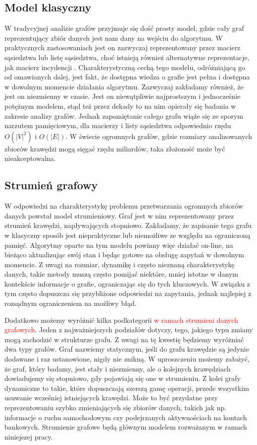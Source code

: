     \subsection{Model klasyczny}
        W tradycyjnej analizie grafów przyjmuje się dość prosty model, gdzie cały graf reprezentujący zbiór danych jest nam dany na wejściu do algorytmu. W praktycznych zastosowaniach jest on zazwyczaj reprezentowany przez macierz sąsiedztwa lub listę sąsiedztwa, choć istnieją również alternatywne reprezentacje, jak macierz incydencji \cite{Wilson_2015}. Charakterystyczną cechą tego modelu, odróżniającą go od omawianych dalej, jest fakt, że dostępna wiedza o grafie jest pełna i dostępna w dowolnym momencie działania algorytmu. Zazwyczaj zakładamy również, że jest on niezmienny w czasie. Jest on niewątpliwie najprostszym i jednocześnie potężnym modelem, stąd też przez dekady to na nim opierały się badania w zakresie analizy grafów. Jednak zapamiętanie całego grafu wiąże się ze sporym narzutem pamięciowym, dla macierzy i listy sąsiedztwa odpowiednio rzędu $O(|V|^2)$ i $O(|E|)$. W świecie ogromnych grafów, gdzie rozmiary analizowanych zbiorów krawędzi mogą sięgać rzędu miliardów, taka złożoność może być nieakceptowalna. 

    \subsection{Strumień grafowy}
        W odpowiedzi na charakterystykę problemu przetwarzania ogromnych zbiorów danych powstał model strumieniowy. Graf jest w nim reprezentowany przez strumień krawędzi, napływających stopniowo. Zakładamy, że zapisanie tego grafu w klasyczny sposób jest niepraktyczne lub niemożliwe ze względu na ograniczoną pamięć. Algorytmy oparte na tym modelu powinny więc działać on-line, na bieżąco aktualizując swój stan i będąc gotowe na obsługę zapytań w dowolnym momencie. Z uwagi na rozmiar, dynamikę i często nieznaną charakterystykę danych, takie metody muszą często pomijać niektóre, mniej istotne w danym kontekście informacje o grafie, ograniczając się do tych kluczowych. W związku z tym często dopuszcza się przybliżone odpowiedzi na zapytania, jednak najlepiej z rozsądnym ograniczeniem na możliwy błąd. 

        Dodatkowo możemy wyróżnić kilka podkategorii \textcolor{red}{w ramach strumieni danych grafowych}. Jeden z najważniejszych podziałów dotyczy, tego, jakiego typu zmiany mogą zachodzić w strukturze grafu. Z uwagi na tę kwestię będziemy wyróżniać dwa typy grafów. Graf nazwiemy statycznym, jeśli do grafu krawędzie są jedynie dodawane i raz ustanowione, nigdy nie znikną. W uproszczeniu możemy założyć, że graf, który badamy, jest stały i niezmienny, ale o kolejnych krawędziach dowiadujemy się stopniowo, gdy pojawiają się one w strumieniu. Z kolei grafy dynamiczne to takie, które dopuszczają szerszą gamę operacji, przede wszystkim usuwanie wcześniej istniejących krawędzi. Może to być przydatne przy reprezentowaniu szybko zmieniających się zbiorów danych, takich jak np. informacje o ruchu samochodowym czy podejrzanych aktywnościach na kontach bankowych. Strumienie grafowe będą głównym modelem rozważanym w ramach niniejszej pracy. 

